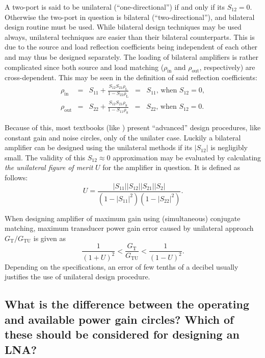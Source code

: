 \documentclass[a4paper, 12pt]{article}
\begin{document}
A two-port is said to be unilateral (``one-directional'') if and only if its $S_{12} = 0$. 
Otherwise the two-port in question is bilateral (``two-directional''), and bilateral design 
routine must be used. While bilateral design techniques may be used always, unilateral 
techniques are easier than their bilateral counterparts. This is due to the source and load 
reflection coefficients being independent of each other and may thus be designed separately. 
The loading of bilateral amplifiers is rather complicated since both source and load 
matching ($\rho_\mathrm{in}$ and $\rho_\mathrm{out}$, respectively) are cross-dependent. 
This may be seen in the definition of said reflection coefficients:
\begin{eqnarray}
\rho_\mathrm{in} & = & S_{11} + \frac{S_{12} S_{21} \rho_\mathrm{L}}{1 - S_{22} \rho_\mathrm{L}} 
	\;\;=\;\; S_{11} \textrm{, when } S_{12} = 0, \label{e:rhoin} \\ 
\rho_\mathrm{out} & = & S_{22} + \frac{S_{12} S_{21} \rho_\mathrm{S}}{1 - S_{11} \rho_\mathrm{S}}
	\;\;=\;\; S_{22} \textrm{, when } S_{12} = 0. \label{e:rhoout}
\end{eqnarray}

Because of this, most textbooks (like \cite{pozar}) present ``advanced'' design 
procedures, like constant gain and noise circles, only of the unilater case. Luckily a 
bilateral amplifier can be designed using the unilateral methods if its $|S_{12}|$ is 
negligibly small. The validity of this $S_{12} \approx 0$ approximation may be evaluated 
by calculating \textit{the unilateral figure of merit} $U$ for the amplifier in question. 
It is defined as follows:
\begin{equation}\label{e:U}
U = \frac{|S_{11}| |S_{12}| |S_{21}| |S_{2}|}{(1 - |S_{11}|^2)(1 - |S_{22}|^2)}.
\end{equation}

When designing amplifier of maximum gain using (simultaneous) conjugate matching, maximum 
transducer power gain error caused by unilateral approach $G_\mathrm{T} / G_\mathrm{TU}$ 
is given as
\begin{equation}\label{e:U2}
\frac{1}{(1+U)^2} < \frac{G_\mathrm{T}}{G_\mathrm{TU}} < \frac{1}{(1-U)^2}.
\end{equation}
Depending on the specifications, an error of few tenths of a decibel usually justifies 
the use of unilateral design procedure.


\subsection{What is the difference between the operating and available pow\-er gain circles? 
	Which of these should be considered for designing an LNA?}
\end{document}
